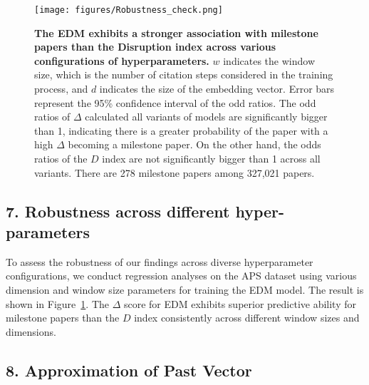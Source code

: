 \documentclass[12pt]{article}
\begin{document}
\begin{refsection}
\begin{figure}[h]
    \centering
    \texttt{[image: figures/Robustness\_check.png]}
    \caption{
\textbf{The EDM exhibits a stronger association with milestone papers than the Disruption index across various configurations of hyperparameters.} $w$ indicates the window size, which is the number of citation steps considered in the training process, and $d$ indicates the size of the embedding vector. Error bars represent the 95\% confidence interval of the odd ratios. The odd ratios of $\Delta$ calculated all variants of models are significantly bigger than 1, indicating there is a greater probability of the paper with a high $\Delta$ becoming a milestone paper. On the other hand, the odds ratios of the $D$ index are not significantly bigger than 1 across all variants. There are 278 milestone papers among 327,021 papers.}
    \label{fig:sup_robustness}
\end{figure}


\subsection*{7. Robustness across different hyper-parameters}

\normalsize 
To assess the robustness of our findings across diverse hyperparameter configurations, we conduct regression analyses on the APS dataset using various dimension and window size parameters for training the EDM model. The result is shown in Figure~\ref{fig:sup_robustness}. The $\Delta$ score for EDM exhibits superior predictive ability for milestone papers than the $D$ index consistently across different window sizes and dimensions.



\subsection*{8. Approximation of Past Vector}


\end{refsection}
\end{document}
